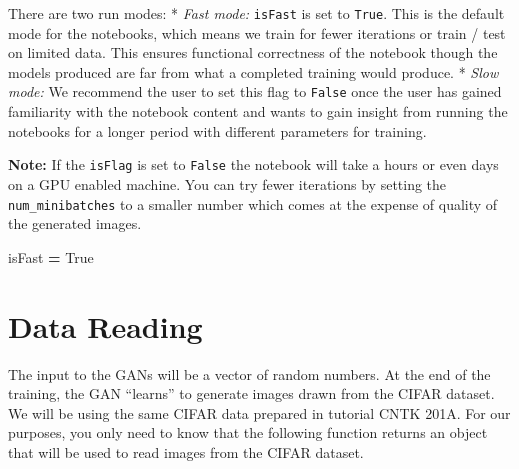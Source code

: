\documentclass[]{book}
\newenvironment{Shaded}{\begin{snugshade}}{\end{snugshade}}
\newcommand{\DecValTok}[1]{\textcolor[rgb]{0.00,0.00,0.81}{#1}}
\newcommand{\ImportTok}[1]{#1}
\newcommand{\CommentTok}[1]{\textcolor[rgb]{0.56,0.35,0.01}{\textit{#1}}}
\newcommand{\VariableTok}[1]{\textcolor[rgb]{0.00,0.00,0.00}{#1}}
\newcommand{\OperatorTok}[1]{\textcolor[rgb]{0.81,0.36,0.00}{\textbf{#1}}}
\newcommand{\NormalTok}[1]{#1}
\theoremstyle{definition}
\theoremstyle{definition}
\theoremstyle{definition}
\theoremstyle{remark}
\begin{document}
\begin{Shaded}
\end{Shaded}

There are two run modes: * \emph{Fast mode: } \texttt{isFast} is set to
\texttt{True}. This is the default mode for the notebooks, which means
we train for fewer iterations or train / test on limited data. This
ensures functional correctness of the notebook though the models
produced are far from what a completed training would produce. *
\emph{Slow mode: } We recommend the user to set this flag to
\texttt{False} once the user has gained familiarity with the notebook
content and wants to gain insight from running the notebooks for a
longer period with different parameters for training.

\textbf{Note: }If the \texttt{isFlag} is set to \texttt{False} the
notebook will take a hours or even days on a GPU enabled machine. You
can try fewer iterations by setting the \texttt{num\_minibatches} to a
smaller number which comes at the expense of quality of the generated
images.

\begin{Shaded}
\begin{Highlighting}[]
\NormalTok{isFast }\OperatorTok{=} \VariableTok{True}
\end{Highlighting}
\end{Shaded}

\section{Data Reading}\label{data-reading}

The input to the GANs will be a vector of random numbers. At the end of
the training, the GAN ``learns'' to generate images drawn from the CIFAR
dataset. We will be using the same CIFAR data prepared in tutorial CNTK
201A. For our purposes, you only need to know that the following
function returns an object that will be used to read images from the
CIFAR dataset.
\end{document}
